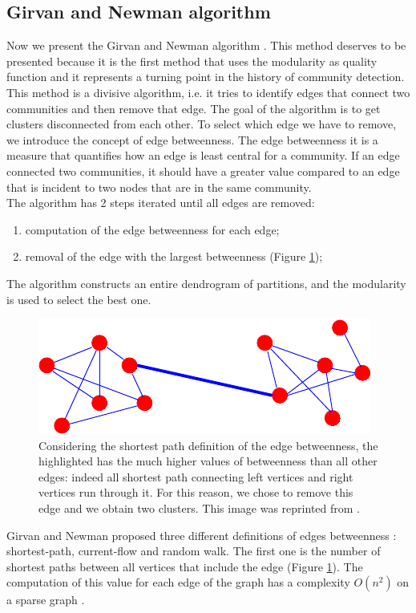 \subsection{Girvan and Newman algorithm}
Now we present the Girvan and Newman algorithm \cite{Girvan2002Community}. This method deserves to be presented because it is the first method that uses the modularity as quality function \cite{Newman_2004} and it represents a turning point in the history of community detection. This method is a divisive algorithm, i.e. it tries to identify edges that connect two communities and then remove that edge. The goal of the algorithm is to get clusters disconnected from each other.  
To select which edge we have to remove, we introduce the concept of edge betweenness.
The edge betweenness it is a measure that quantifies how an edge is least central for a community. 
If an edge connected two communities, it should have a greater value compared to an edge that is incident to two nodes that are in the same community. \\
The algorithm has 2 steps iterated until all edges are removed:
\begin{enumerate}
	\item computation of the edge betweenness for each edge;
	\item removal of the edge with the largest betweenness (Figure \ref{fig:edgebtw});
\end{enumerate}
The algorithm constructs an entire dendrogram of partitions, and the modularity is used to select the best one.
\begin{figure}
	\centering
	\includegraphics[width=0.7\linewidth]{0-resources/edgebtw}
	\caption{Considering the shortest path definition of the edge betweenness, the highlighted has the much higher values of betweenness than all other edges: indeed all shortest path connecting left vertices and right vertices run through it. For this reason, we chose to remove this edge and we obtain two clusters. This image was reprinted from \cite{fortunato}. }
	\label{fig:edgebtw}
\end{figure}
\noindent Girvan and Newman proposed three different definitions of edges betweenness \cite{Newman_2004}: shortest-path, current-flow and random walk. The first one is the number of shortest paths between all vertices that include the edge (Figure \ref{fig:edgebtw}). The computation of this value for each edge of the graph has a complexity $O(n^2)$ on a sparse graph \cite{Newman_2004}. 

